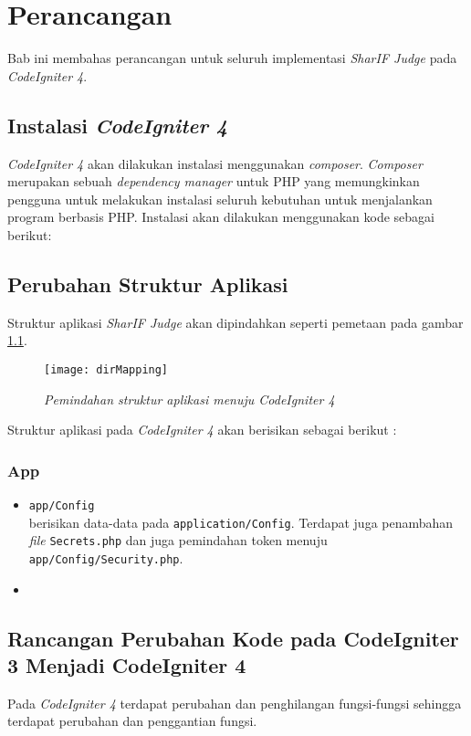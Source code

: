 \chapter{Perancangan}
\label{chap:perancangan}
Bab ini membahas perancangan untuk seluruh implementasi \textit{SharIF Judge} pada \textit{CodeIgniter 4}.

\section{Instalasi \textit{CodeIgniter 4}}
\textit{CodeIgniter 4} akan dilakukan instalasi menggunakan \textit{composer}. \textit{Composer} merupakan sebuah \textit{dependency manager} untuk PHP yang memungkinkan pengguna untuk melakukan instalasi seluruh kebutuhan untuk menjalankan program berbasis PHP. Instalasi akan dilakukan menggunakan kode sebagai berikut:

\section{Perubahan Struktur Aplikasi}
\label{sec:perubahanStruktur}
Struktur aplikasi \textit{SharIF Judge} akan dipindahkan seperti pemetaan pada gambar \ref{fig:dirMappingBab4}.

\begin{figure}[H]
	\centering  
	\texttt{[image: dirMapping]}  
	\caption[\textit{Pemindahan struktur aplikasi menuju \textit{CodeIgniter 4}}]{\textit{Pemindahan struktur aplikasi menuju \textit{CodeIgniter 4}}} 
	\label{fig:dirMappingBab4} 
\end{figure} 

Struktur aplikasi pada \textit{CodeIgniter 4} akan berisikan sebagai berikut :
\subsection{App}
\begin{itemize}
	\item \texttt{app/Config}\\ berisikan data-data pada \texttt{application/Config}. Terdapat juga penambahan \textit{file} \texttt{Secrets.php} dan juga pemindahan token menuju \texttt{app/Config/Security.php}.  
	\item \texttt{}\\ 
\end{itemize}
\section{Rancangan Perubahan Kode pada CodeIgniter 3 Menjadi CodeIgniter 4}
\label{sec:rancanganPerubahanKode}
Pada \textit{CodeIgniter 4} terdapat perubahan dan penghilangan fungsi-fungsi sehingga terdapat perubahan dan penggantian fungsi.
